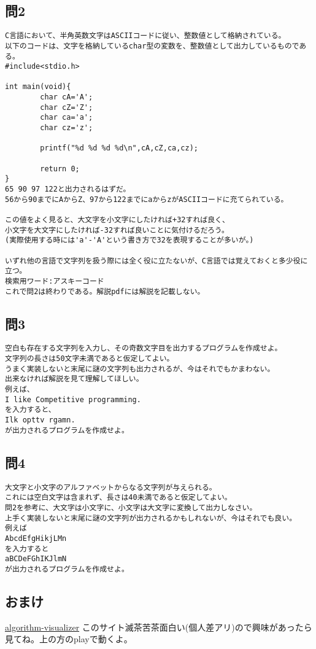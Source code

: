 \subsection{問2}
\begin{verbatim}
C言語において、半角英数文字はASCIIコードに従い、整数値として格納されている。
以下のコードは、文字を格納しているchar型の変数を、整数値として出力しているものである。
#include<stdio.h>

int main(void){
        char cA='A';
        char cZ='Z';
        char ca='a';
        char cz='z';
	
        printf("%d %d %d %d\n",cA,cZ,ca,cz);
	
        return 0;
}
65 90 97 122と出力されるはずだ。
56から90までにAからZ、97から122までにaからzがASCIIコードに充てられている。

この値をよく見ると、大文字を小文字にしたければ+32すれば良く、
小文字を大文字にしたければ-32すれば良いことに気付けるだろう。
(実際使用する時には'a'-'A'という書き方で32を表現することが多いが。)

いずれ他の言語で文字列を扱う際には全く役に立たないが、C言語では覚えておくと多少役に立つ。
検索用ワード:アスキーコード
これで問2は終わりである。解説pdfには解説を記載しない。
\end{verbatim}

\subsection{問3}
\begin{verbatim}
空白も存在する文字列を入力し、その奇数文字目を出力するプログラムを作成せよ。
文字列の長さは50文字未満であると仮定してよい。
うまく実装しないと末尾に謎の文字列も出力されるが、今はそれでもかまわない。
出来なければ解説を見て理解してほしい。
例えば、
I like Competitive programming.
を入力すると、
Ilk opttv rgamn.
が出力されるプログラムを作成せよ。
\end{verbatim}

\subsection{問4}
\begin{verbatim}
大文字と小文字のアルファベットからなる文字列が与えられる。
これには空白文字は含まれず、長さは40未満であると仮定してよい。
問2を参考に、大文字は小文字に、小文字は大文字に変換して出力しなさい。
上手く実装しないと末尾に謎の文字列が出力されるかもしれないが、今はそれでも良い。
例えば
AbcdEfgHikjLMn
を入力すると
aBCDeFGhIKJlmN
が出力されるプログラムを作成せよ。
\end{verbatim}

\subsection{おまけ}
\href{https://algorithm-visualizer.org/divide-and-conquer/quicksort}{algorithm-visualizer}\newline
このサイト滅茶苦茶面白い(個人差アリ)ので興味があったら見てね。上の方のplayで動くよ。